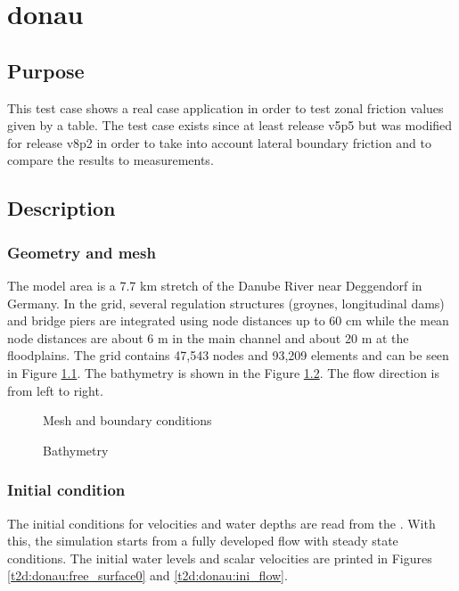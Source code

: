 \chapter{donau}

\section{Purpose}
This test case shows a real case application in order to test zonal friction
values given by a table.
The test case exists since at least release v5p5 but was modified for release
v8p2 in order to take into account lateral boundary friction and to compare the
results to measurements.

\section{Description}

\subsection{Geometry and mesh}
The model area is a 7.7 km stretch of the Danube River near Deggendorf in Germany.
In the grid, several regulation structures (groynes, longitudinal dams) and
bridge piers are integrated using node distances up to 60 cm while the mean
node distances are about 6 m in the main channel and about 20 m at the floodplains.
The grid contains 47,543 nodes and 93,209 elements and can be seen in Figure
\ref{t2d:donau:mesh}.
The bathymetry is shown in the Figure \ref{t2d:donau:Bathy}.
The flow direction is from left to right.

\begin{figure}[h!]
\centering
{}
\caption{Mesh and boundary conditions}
\label{t2d:donau:mesh}
\end{figure}


\begin{figure} [h!]
\centering
{}
\caption{Bathymetry}
\label{t2d:donau:Bathy}
\end{figure}


\subsection{Initial condition}

The initial conditions for velocities and water depths are read from the
.
With this, the simulation starts from a fully developed flow with steady state
conditions.
The initial water levels and scalar velocities are printed in Figures
\ref{t2d:donau:free_surface0} and \ref{t2d:donau:ini_flow}.

